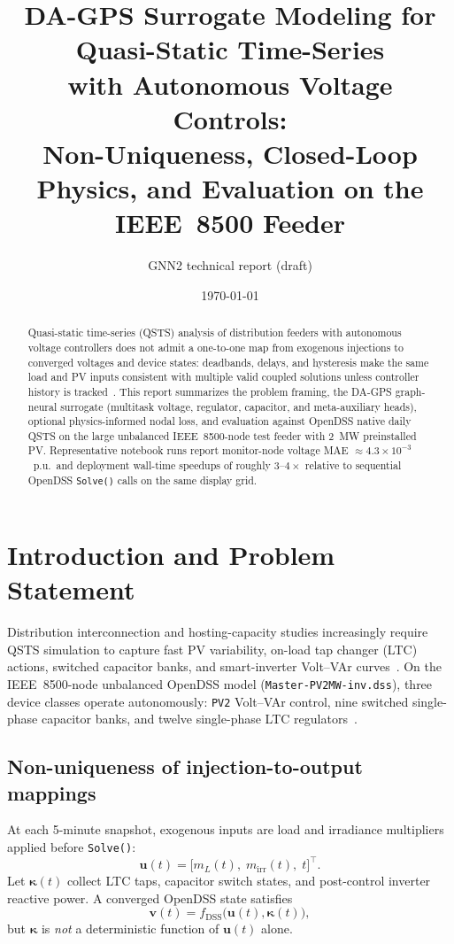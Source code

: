 \documentclass[11pt,a4paper]{article}
\title{DA-GPS Surrogate Modeling for Quasi-Static Time-Series\\
with Autonomous Voltage Controls:\\
Non-Uniqueness, Closed-Loop Physics, and Evaluation on the IEEE~8500 Feeder}
\author{GNN2 technical report (draft)}
\date{\today}
\begin{document}
\maketitle

\begin{abstract}
Quasi-static time-series (QSTS) analysis of distribution feeders with autonomous
voltage controllers does not admit a one-to-one map from exogenous injections to
converged voltages and device states: deadbands, delays, and hysteresis make the
same load and PV inputs consistent with multiple valid coupled solutions unless
controller history is tracked~\cite{deboever2017qsts}.
This report summarizes the problem framing, the DA-GPS graph-neural surrogate
(multitask voltage, regulator, capacitor, and meta-auxiliary heads), optional
physics-informed nodal loss, and evaluation against OpenDSS native daily QSTS on
the large unbalanced IEEE~8500-node test feeder with 2~MW preinstalled PV.
Representative notebook runs report monitor-node voltage MAE $\approx 4.3\times
10^{-3}$~p.u.\ and deployment wall-time speedups of roughly $3$--$4\times$
relative to sequential OpenDSS \texttt{Solve()} calls on the same display grid.
\end{abstract}

\section{Introduction and Problem Statement}
\label{sec:problem}

Distribution interconnection and hosting-capacity studies increasingly require
QSTS simulation to capture fast PV variability, on-load tap changer (LTC)
actions, switched capacitor banks, and smart-inverter Volt--VAr
curves~\cite{deboever2017qsts,reno2017vq,ieee1547}.
On the IEEE~8500-node unbalanced OpenDSS model (\texttt{Master-PV2MW-inv.dss}),
three device classes operate autonomously: \texttt{PV2} Volt--VAr control, nine
switched single-phase capacitor banks, and twelve single-phase LTC
regulators~\cite{gnn2_ieee8500_avc,ieee8500}.

\subsection{Non-uniqueness of injection-to-output mappings}

At each 5-minute snapshot, exogenous inputs are load and irradiance multipliers
applied before \texttt{Solve()}:
\begin{equation}
  \mathbf{u}(t) = \big[m_L(t),\; m_{\mathrm{irr}}(t),\; t\big]^\top .
  \label{eq:inputs}
\end{equation}
Let $\boldsymbol{\kappa}(t)$ collect LTC taps, capacitor switch states, and
post-control inverter reactive power.  A converged OpenDSS state satisfies
\begin{equation}
  \mathbf{v}(t) = f_{\mathrm{DSS}}\!\big(\mathbf{u}(t),\boldsymbol{\kappa}(t)\big),
\end{equation}
but $\boldsymbol{\kappa}$ is \emph{not} a deterministic function of
$\mathbf{u}(t)$ alone.
\end{document}
